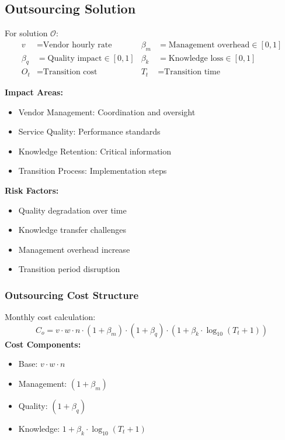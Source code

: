 \documentclass[12pt,a4paper]{article}
\newenvironment{definition}[1]
{\begin{mdframed}[style=definitionstyle,frametitle={Definition: #1}]}
{\end{mdframed}}
\newenvironment{explanation}
{\begin{mdframed}[style=explanationstyle,frametitle={Explanation}]}
{\end{mdframed}}
\begin{document}
\subsection{Outsourcing Solution}
\begin{definition}{Outsourcing Variables}
For solution $\mathcal{O}$:
\begin{align*}
    v &= \text{Vendor hourly rate} & \beta_m &= \text{Management overhead} \in [0,1] \\
    \beta_q &= \text{Quality impact} \in [0,1] & \beta_k &= \text{Knowledge loss} \in [0,1] \\
    O_t &= \text{Transition cost} & T_t &= \text{Transition time}
\end{align*}
\end{definition}

\begin{explanation}
\textbf{Impact Areas:}
\begin{itemize}
    \item Vendor Management: Coordination and oversight
    \item Service Quality: Performance standards
    \item Knowledge Retention: Critical information
    \item Transition Process: Implementation steps
\end{itemize}
\textbf{Risk Factors:}
\begin{itemize}
    \item Quality degradation over time
    \item Knowledge transfer challenges
    \item Management overhead increase
    \item Transition period disruption
\end{itemize}
\end{explanation}

\subsubsection{Outsourcing Cost Structure}
\begin{definition}{Outsourcing Cost}
Monthly cost calculation:
\begin{equation}
    C_o = v \cdot w \cdot n \cdot (1 + \beta_m) \cdot (1 + \beta_q) \cdot (1 + \beta_k \cdot \log_{10}(T_t + 1))
\end{equation}
\textbf{Cost Components:}
\begin{itemize}
    \item Base: $v \cdot w \cdot n$
    \item Management: $(1 + \beta_m)$
    \item Quality: $(1 + \beta_q)$
    \item Knowledge: $1 + \beta_k \cdot \log_{10}(T_t + 1)$
\end{itemize}
\end{definition}
\end{document}
